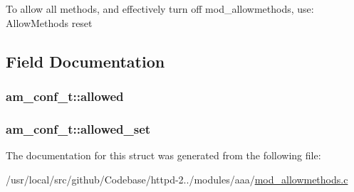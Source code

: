 To allow all methods, and effectively turn off mod\+\_\+allowmethods, use\+: Allow\+Methods reset 

\subsection{Field Documentation}
\subsubsection[{\texorpdfstring{allowed}{allowed}}]{ am\+\_\+conf\+\_\+t\+::allowed}\hypertarget{structam__conf__t_abb389a7ad017b8d2a3f897ae911e02e5}{}\label{structam__conf__t_abb389a7ad017b8d2a3f897ae911e02e5}
\subsubsection[{\texorpdfstring{allowed\+\_\+set}{allowed_set}}]{ am\+\_\+conf\+\_\+t\+::allowed\+\_\+set}\hypertarget{structam__conf__t_a7061dd091ec75bdb12cb8eaa1ecdb812}{}\label{structam__conf__t_a7061dd091ec75bdb12cb8eaa1ecdb812}


The documentation for this struct was generated from the following file\+:\begin{DoxyCompactItemize}
\item 
/usr/local/src/github/\+Codebase/httpd-\/2../modules/aaa/\hyperlink{mod__allowmethods_8c}{mod\+\_\+allowmethods.\+c}\end{DoxyCompactItemize}
